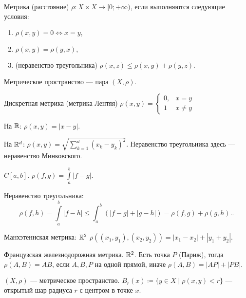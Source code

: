 \begin{definition}
    Метрика (расстояние) $\rho\!: X \times X \to [0;+\infty)$, если выполняются следующие условия:
     \begin{enumerate}
         \item $\rho(x, y) = 0 \iff x = y$,
         \item $\rho(x, y) = \rho(y, x)$,
         \item  (неравенство треугольника) $\rho(x, z) \le \rho(x, y) + \rho(y, z)$.
    \end{enumerate}
\end{definition}
\begin{definition}
    Метрическое пространство --- пара $(X, \rho)$.
\end{definition}
\begin{example}
    Дискретная метрика (метрика Лентяя) $\rho(x, y) = \begin{cases} 0, & x = y \\ 1 & x \neq y\end{cases}$
\end{example}
\begin{example}
    На $\mathbb{R}$:  $\rho(x, y) = |x-y|$.
\end{example}
\begin{example}
    На $\mathbb{R}^d$:  $\rho(x, y) = \sqrt{\sum\limits_{k=1}^d (x_k - y_k)^2}$. Неравенство треугольника здесь --- неравенство Минковского.
\end{example}
\begin{example}
    $C[a, b]$.  $\rho(f, g) = \int\limits_a^b |f-g|$.

    Неравенство треугольника:  \[
    \rho(f, h) = \int\limits_a^b |f-h| \le \int_a^b(|f-g|+|g-h|) = \rho(f, g) + \rho(g, h).
    .\] 
\end{example}
\begin{example}
    Манхэтеннская метрика: $\mathbb{R}^2$  $\rho((x_1, y_1), (x_2, y_2)) = |x_1 - x_2| + |y_1 + y_2|$.
\end{example}
\begin{example}
    Французская железнодорожная метрика. $\mathbb{R}^2$. Есть точка  $P$ (Париж), тогда  $\rho(A, B) = AB$, если  $A, B,P$ на одной прямой, иначе  $\rho(A, B) = |AP|+|PB|$. 
\end{example}
\begin{definition}
    $(X, \rho)$ --- метрическое пространство.  $B_r(x) \coloneqq \{y \in X \mid \rho(x, y) < r\}$ --- открытый шар радиуса  $r$ с центром в точке  $x$. 
\end{definition}
